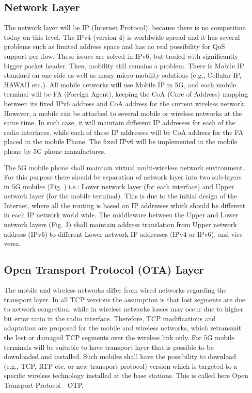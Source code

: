 \documentclass[conference]{IEEEtran}
\begin{document}
\subsection{Network Layer}
The network layer will be IP (Internet Protocol), because there is no competition today on this level. The IPv4 (version 4) is worldwide spread and it has several problems such as  limited address space and has no real possibility for QoS support per flow. These issues are solved in IPv6, but traded with significantly bigger packet header. Then, mobility still remains a problem. There is Mobile IP standard on one side as well as many micro-mobility solutions (e.g., Cellular IP, HAWAII etc.). All mobile networks will use Mobile IP in 5G, and each mobile terminal will be FA (Foreign Agent), keeping the CoA (Care of Address) mapping between its fixed IPv6 address and CoA address for the current wireless network. However, a mobile can be attached to several mobile or wireless networks at the same time. In such case, it will maintain different IP addresses for each of the radio interfaces, while each of these IP addresses will be CoA address for the FA placed in the mobile Phone. The fixed IPv6 will be implemented in the mobile phone by 5G phone manufactures.

\par
The 5G mobile phone shall maintain virtual multi-wireless network environment. For this purpose there should be separation of network layer into two sub-layers in 5G mobiles (Fig. ) i.e.: Lower network layer (for each interface) and Upper network layer (for the mobile terminal). This is due to the initial design of the Internet, where all the routing is based on IP addresses which should be different in each IP network world wide. The middleware between the Upper and Lower network layers (Fig. 3) shall maintain address translation from Upper network address (IPv6) to different Lower network IP addresses (IPv4 or IPv6), and vice versa.

\subsection{Open Transport Protocol (OTA) Layer}
The mobile and wireless networks differ from wired networks regarding the transport layer. In all TCP versions the assumption is that lost segments are due to network congestion, while in wireless networks losses may occur due to higher bit error ratio in the radio interface. Therefore, TCP modifications and adaptation are proposed for the mobile and wireless networks, which retransmit the lost or damaged TCP segments over the wireless link only. For 5G mobile terminals will be suitable to have transport layer that is possible to be downloaded and installed. Such mobiles shall have the possibility to download (e.g., TCP, RTP etc. or new transport  protocol) version which is targeted to a specific wireless technology installed at the base stations. This is called here Open Transport Protocol - OTP.
\end{document}
